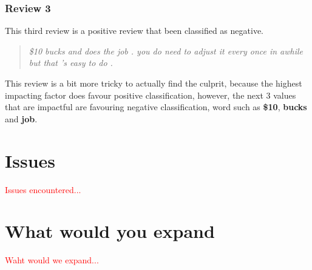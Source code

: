 \documentclass[runningheads]{llncs}
\begin{document}
    \subsubsection{Review 3}
    This third review is a positive review that been classified as negative.
    \begin{quotation}
        \textit{\$10 bucks and does the job . you do need to adjust it every once in awhile but that 's easy to do .}
    \end{quotation}
    This review is a bit more tricky to actually find the culprit, because the highest impacting factor does favour positive classification, however, the next 3 values that are impactful are favouring negative classification, word such as \textbf{\$10}, \textbf{bucks} and \textbf{job}.
    
    \section{Issues}
    \textcolor{red}{Issues encountered...}
    \section{What would you expand}
    \textcolor{red}{Waht would we expand...}
    
    
    
\end{document}
